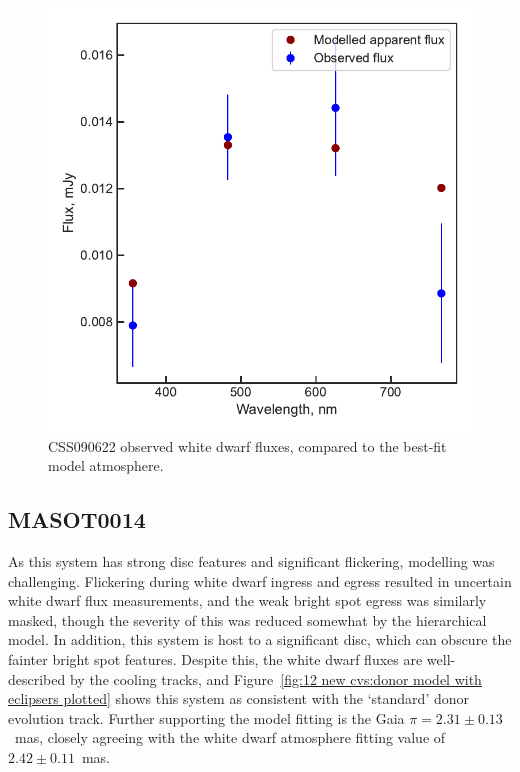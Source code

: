 \begin{figure}
    \centering
    \includegraphics[width=\textwidth]{figures/results/CSS090622/fluxplot.pdf}
    \caption{CSS090622 observed white dwarf fluxes, compared to the best-fit model atmosphere.}
    \label{fig:CSS090622 flux plot}
\end{figure}
\clearpage



\newpage
\subsection{MASOT0014}

As this system has strong disc features and significant flickering, modelling was challenging. Flickering during white dwarf ingress and egress resulted in uncertain white dwarf flux measurements, and the weak bright spot egress was similarly masked, though the severity of this was reduced somewhat by the hierarchical model. In addition, this system is host to a significant disc, which can obscure the fainter bright spot features.
Despite this, the white dwarf fluxes are well-described by the cooling tracks, and Figure~\ref{fig:12 new cvs:donor model with eclipsers plotted} shows this system as consistent with the `standard' donor evolution track.
Further supporting the model fitting is the Gaia $\pi = 2.31 \pm 0.13$~mas, closely agreeing with the white dwarf atmosphere fitting value of $2.42\pm0.11$~mas.

